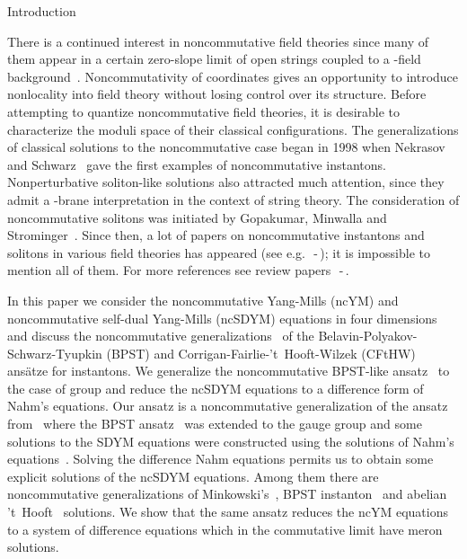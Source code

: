 \documentclass[a4paper,11pt]{article}
\makeatletter
\renewcommand{\section}{\@startsection{section}{1}{0pt}{\medskipamount}
{\medskipamount}{\large\bf}}
\numberwithin{equation}{section}
\makeatother
\begin{document}
\section{Introduction}

There is a continued interest in  noncommutative 
field theories since many of them appear in a certain zero-slope
limit of open strings coupled to a \coordHE{}-field background~\cite{Seiberg:1999}.
Noncommutativity of coordinates gives an opportunity
to introduce nonlocality into field theory without losing control 
over its structure. Before attempting to quantize noncommutative 
field theories, it is desirable to characterize the moduli space of 
their classical configurations. The generalizations of classical 
solutions to the noncommutative case began in 1998 when Nekrasov and 
Schwarz~\cite{NS} gave the first examples of noncommutative instantons. 
Nonperturbative soliton-like solutions also attracted much attention, 
since they admit a \coordHE{}-brane interpretation in the context of string 
theory. The consideration of noncommutative solitons was initiated by 
Gopakumar, Minwalla and Strominger~\cite{Gopakumar:2000}. Since then, 
a lot of papers on noncommutative instantons and solitons in various 
field theories has appeared (see e.g.~\cite{Fur}\,-\,\cite{Ishikawa}); 
it is impossible to mention all of them. For more references see 
review papers~\cite{Nekrasov}\,-\,\cite{Konechny:2001}.

In this paper we consider the  noncommutative Yang-Mills (ncYM) and 
noncommutative self-dual Yang-Mills (ncSDYM) equations in four dimensions 
and discuss the noncommutative generalizations~\cite{Correa1, LP1} of the 
Belavin-Polyakov-Schwarz-Tyupkin (BPST) and Corrigan-Fairlie-'t~Hooft-Wilzek 
(CFtHW) ans\"atze for \coordHE{} instantons. We generalize the noncommutative 
BPST-like ansatz~\cite{Correa1} to the case of \coordHE{} group and  reduce the 
ncSDYM equations to a difference form of Nahm's equations.  Our ansatz is a 
noncommutative generalization of the ansatz from~\cite{Ivanova:tu} 
where the BPST ansatz~\cite{Belavin} was extended to the \coordHE{} gauge group 
and some solutions to the SDYM equations were constructed using the solutions 
of Nahm's equations~\cite{Nahm}. Solving the difference Nahm equations permits 
us to obtain some explicit solutions of the ncSDYM equations. Among them there 
are  noncommutative generalizations of Minkowski's~\cite{Mink}, 
BPST instanton~\cite{Belavin} and abelian 't~Hooft~\cite{'tHooft} solutions.
We show that the same ansatz reduces the ncYM equations to a system of 
difference equations which in the commutative limit have meron solutions.                          
\end{document}
